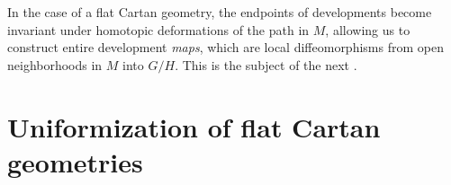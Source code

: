 In the case of a flat Cartan geometry, the endpoints of developments become invariant under homotopic deformations of the path in $M$, allowing us to construct entire development \emph{maps}, which are local diffeomorphisms from open neighborhoods in $M$ into $G\slash H$. This is the subject of the next \sect.







\section{Uniformization of flat Cartan geometries}\label{sec: uniformization of cartan}





